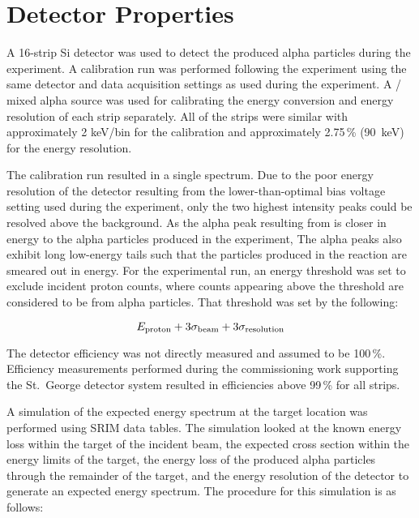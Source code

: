 \section{Detector Properties}
\label{sec:detector-properties}

A 16-strip Si detector was used to detect the produced alpha particles
during the experiment. A calibration run was performed following the
experiment using the same detector and data acquisition settings as used
during the experiment. A / mixed alpha source was used
for calibrating the energy conversion and energy resolution of each
strip separately. All of the strips were similar with approximately 2
keV/bin for the calibration and approximately 2.75\,\% (90~keV) for the
energy resolution.

The calibration run resulted in a single spectrum. Due to the poor
energy resolution of the detector resulting from the lower-than-optimal
bias voltage setting used during the experiment, only the two highest
intensity peaks could be resolved above the background. As the alpha
peak resulting from  is closer in energy to the alpha
particles produced in the experiment, The alpha peaks also exhibit long
low-energy tails such that the particles produced in the reaction are
smeared out in energy. For the experimental run, an energy threshold was
set to exclude incident proton counts, where counts appearing above the
threshold are considered to be from alpha particles. That threshold was
set by the following:

\begin{equation}
    E_{\rm proton} + 3 \sigma_{\rm beam} + 3 \sigma_{\rm resolution}
\end{equation}

The detector efficiency was not directly measured and assumed to be
100\,\%. Efficiency measurements performed during the commissioning work
supporting the St.\ George detector system resulted in efficiencies above
99\,\% for all strips.

A simulation of the expected energy spectrum at the target location was
performed using SRIM data tables. The simulation looked at the known
energy loss within the target of the incident beam, the expected cross
section within the energy limits of the target, the energy loss of the
produced alpha particles through the remainder of the target, and the
energy resolution of the detector to generate an expected energy
spectrum. The procedure for this simulation is as follows:


